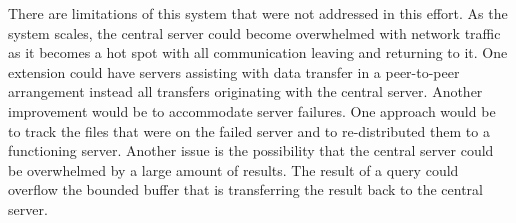 \documentclass{article}
\newenvironment{Figure}
               {\par\medskip\noindent\minipage{\linewidth}}
               {\endminipage\par\medskip}
\begin{document}
\begin{multicols}{2}
\begin{Figure}
  \centering
  \noindent{}
\end{Figure}


There are limitations of this system that were not addressed in this effort.  As the system scales, the central server could become overwhelmed with network traffic as it becomes a hot spot with all communication leaving and returning to it. One extension could have servers assisting with data transfer in a peer-to-peer arrangement instead all transfers originating with the central server.  Another improvement would be to accommodate server failures. One approach would be to track the files that were on the failed server and to re-distributed them to a functioning server.  Another issue is the possibility that the central server could be overwhelmed by a large amount of results. The result of a query could overflow the bounded buffer that is transferring the result back to the central server.   



\end{multicols}
\end{document}
